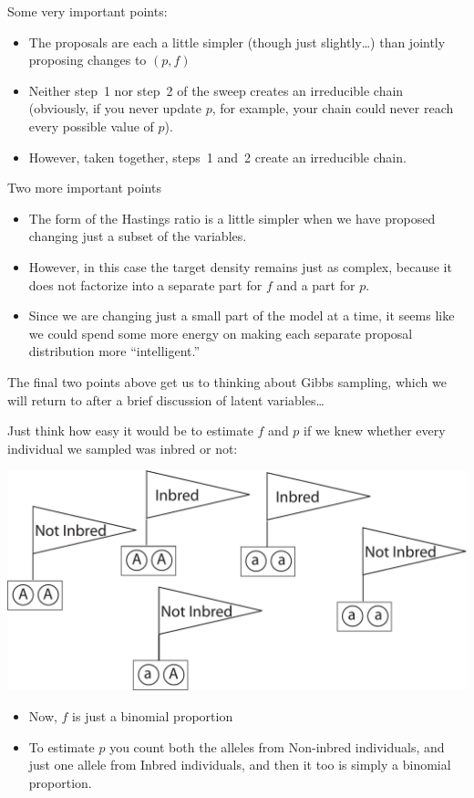 Some very important points:
\begin{itemize}
\item The proposals are each a little simpler (though just slightly\ldots) than jointly proposing changes to $(p,f)$
\item Neither step~1 nor step~2 of the sweep creates an irreducible chain (obviously, if you never update $p$, for example, your chain could never reach every possible value of $p$).
\item However, taken together, steps~1 and~2 create an irreducible chain.
\end{itemize}


Two more important points
\begin{itemize}
\item The form of the Hastings ratio is a little simpler when we have proposed changing just a subset of the variables.
\item However, in this case the target density remains just as complex, because it does not factorize into a separate part for $f$ and a part for $p$.
\item Since we are changing just a small part of the model at a time, it seems like we could spend some more energy on making each separate proposal distribution more ``intelligent.''
\end{itemize}

The final two points above get us to thinking about Gibbs sampling, which we will return to after a brief discussion of latent variables\ldots






Just think how easy it would be to estimate $f$ and $p$ if we knew whether every individual we sampled was inbred or not:
\enlargethispage*{1000pt}
\begin{center}
\includegraphics[width=.65\textwidth]{illus/InbreedingFlags.pdf}
\end{center}
\begin{itemize}
\item Now, $f$ is just a binomial proportion
\item To estimate $p$ you count both the alleles from Non-inbred individuals, and just one allele from Inbred individuals, and then it too is simply a binomial proportion.
\end{itemize}

